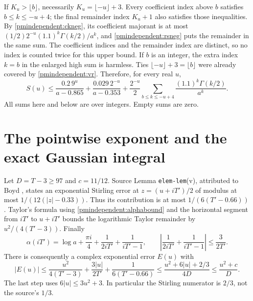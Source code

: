 If $K_u>\lfloor b\rfloor$, necessarily $K_u=\lfloor-u\rfloor+3$.
Every coefficient index above $b$ satisfies $b\le k\le-u+4$;
the final remainder index $K_u+1$ also satisfies those inequalities.
By \eqref{pmindependent:ckneg}, its coefficient majorant is at most
$(1/2)2^{-u}(1.1)^k\Gamma(k/2)/a^k$, and \eqref{pmindependent:rsneg}
puts the remainder in the same sum. The coefficient indices and
the remainder index are distinct, so no index is counted twice
for this upper bound. If $b$ is an integer, the extra index $k=b$
in the enlarged high sum is harmless. Ties
$\lfloor-u\rfloor+3=\lfloor b\rfloor$ were already covered by
\eqref{pmindependent:vr}. Therefore, for every real $u$,
\begin{equation}\label{pmindependent:Sbound}
 S(u)\le\frac{0.2\,9^u}{a-0.865}
       +\frac{0.029\,2^{-u}}{a-0.353}
       +\frac{2^{-u}}2\sum_{b\le k\le-u+4}
                              \frac{(1.1)^k\Gamma(k/2)}{a^k}.
\end{equation}
All sums here and below are over integers. Empty sums are zero.

\section{The pointwise exponent and the exact Gaussian integral}

Let $D=T-3\ge97$ and $c=11/12$. Source Lemma
\texttt{elem-lem}(v), attributed to Boyd \cite{pmindependent:polymath,pmindependent:boyd},
states an exponential Stirling error at $z=(u+iT')/2$ of modulus
at most $1/(12(|z|-0.33))$. Thus its contribution is at most
$1/(6(T'-0.66))$. Taylor's formula using \eqref{pmindependent:alphabound}
and the horizontal segment from $iT'$ to $u+iT'$ bounds the
logarithmic Taylor remainder by $u^2/(4(T'-3))$. Finally
\[
 \alpha(iT')=\log a+\frac{\pi i}4+\frac1{2iT'}+\frac1{iT'-1},
 \qquad
 \left|\frac1{2iT'}+\frac1{iT'-1}\right|\le\frac3{2T'}.
\]
There is consequently a complex exponential error $E(u)$ with
\begin{equation}\label{pmindependent:Ebound}
 |E(u)|\le\frac{u^2}{4(T'-3)}+\frac{3|u|}{2T'}
                      +\frac1{6(T'-0.66)}
 \le\frac{u^2+6|u|+2/3}{4D}
 \le\frac{u^2+c}{D}.
\end{equation}
The last step uses $6|u|\le3u^2+3$. In particular the Stirling
numerator is $2/3$, not the source's $1/3$.

